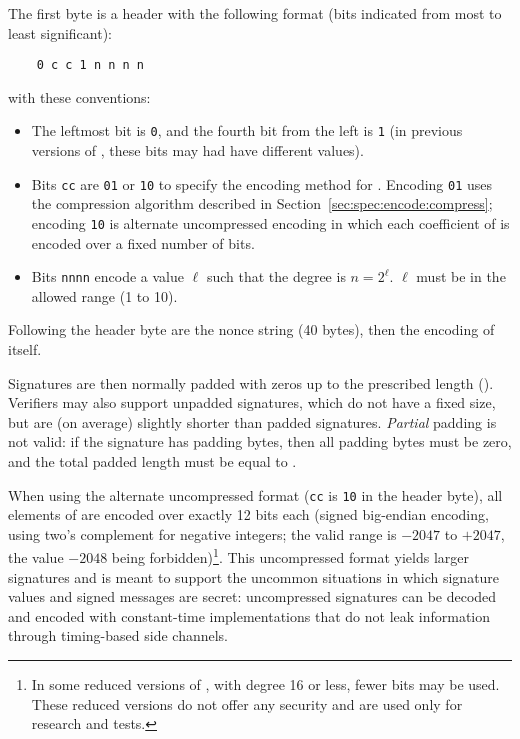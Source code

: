 The first byte is a header with the following format (bits indicated
from most to least significant):
\begin{verbatim}
    0 c c 1 n n n n
\end{verbatim}
with these conventions:
\begin{itemize}

    \item The leftmost bit is \texttt{0}, and the fourth bit from the left
    is \texttt{1} (in previous versions of \falcon, these bits may had
    have different values).

    \item Bits \texttt{cc} are \texttt{01} or \texttt{10} to specify the
    encoding method for \comps. Encoding \texttt{01} uses the compression
    algorithm described in Section~\ref{sec:spec:encode:compress};
    encoding \texttt{10} is alternate uncompressed encoding in which each
    coefficient of \comps is encoded over a fixed number of bits.

    \item Bits \texttt{nnnn} encode a value $\ell$ such that the
    \falcon degree is $n = 2^\ell$. $\ell$ must be in the allowed
    range (1 to 10).

\end{itemize}

Following the header byte are the nonce string \salt (40 bytes), then
the encoding of \comps itself.

Signatures are then normally padded with zeros up to the prescribed
length (\sigbytelen). Verifiers may also support unpadded signatures,
which do not have a fixed size, but are (on average) slightly shorter
than padded signatures. \emph{Partial} padding is not valid: if the
signature has padding bytes, then all padding bytes must be zero, and
the total padded length must be equal to \sigbytelen.

When using the alternate uncompressed format (\texttt{cc} is \texttt{10}
in the header byte), all elements of \comps are encoded over exactly 12
bits each (signed big-endian encoding, using two's complement for
negative integers; the valid range is $-2047$ to $+2047$, the value
$-2048$ being forbidden)\footnote{In some reduced versions of \falcon,
with degree 16 or less, fewer bits may be used. These reduced versions
do not offer any security and are used only for research and tests.}.
This uncompressed format yields larger signatures and is meant to
support the uncommon situations in which signature values and signed
messages are secret: uncompressed signatures can be decoded and encoded
with constant-time implementations that do not leak information through
timing-based side channels.

